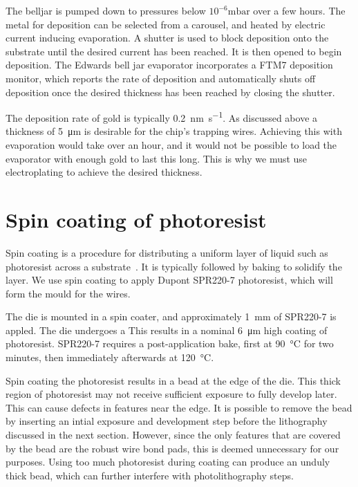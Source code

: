 The belljar is pumped down to pressures below $10^{-6}\si{\milli\bar}$ over a
few hours. The metal for deposition can be selected from a carousel, and heated
by electric current inducing evaporation.  A shutter is used to block
deposition onto the substrate until the desired current has been reached. It is
then opened to begin deposition.
The Edwards bell jar evaporator incorporates a FTM7 deposition monitor, which
reports the rate of deposition and automatically shuts off deposition once the
desired thickness has been reached by closing the shutter. 

The deposition rate of gold is typically \SI{0.2}{\nano\meter\per\second}.
%
%
As discussed above a thickness of \SI{5}{\micro\meter} is desirable for the
chip's trapping wires. Achieving this with evaporation would take over an hour,
and it would not be possible to load the evaporator with enough gold to last
this long. This is why we must use electroplating to achieve the desired
thickness.

\section{Spin coating of photoresist}
\label{fab:spin}

Spin coating is a procedure for distributing a uniform layer of liquid such as
photoresist  across a substrate~\cite{Cohen2011}. It is typically followed by
baking to solidify the layer. We use spin coating to apply Dupont SPR220-7
\cite{} photoresist, which will form the mould for the wires.

The die is mounted in a spin coater, and approximately \SI{1}{\milli\meter} of
SPR220-7 is appled. The die undergoes a  This results in a nominal \SI{6}{\micro\meter} high
coating of photoresist. SPR220-7 requires a post-application bake, first at
\SI{90}{\celsius} for two minutes, then immediately afterwards at
\SI{120}{\celsius}.

Spin coating the photoresist results in a bead at the edge of the die. This
thick region of photoresist may not receive sufficient exposure to fully
develop later. This can cause defects in features near the edge. It is
possible to remove the bead by inserting an intial exposure and development
step before the lithography discussed in the next section. However, since the
only features that are covered by the bead are the robust wire bond pads, this
is deemed unnecessary for our purposes.  Using too much photoresist during coating can
produce an unduly thick bead, which can further interfere with photolithography
steps.

